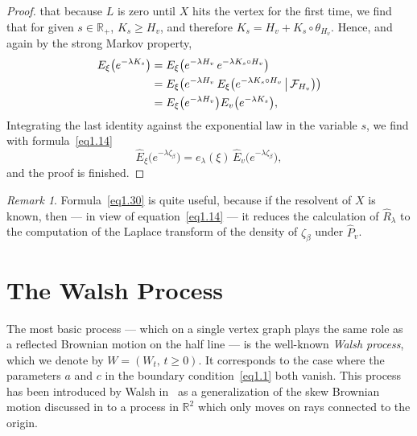 \documentclass[11pt,a4paper]{amsart}
\newcommand{\gb}{\beta}
\newcommand{\gl}{\lambda}
\newcommand{\cF}{\mathcal{F}}
\newcommand{\1}{1}
\newcommand{\R}{\mathbb{R}}
\theoremstyle{remark}
\newtheorem{remark}[theorem]{Remark}
\let\comp\circ
\newcommand{\cond}{\ensuremath\,\big|\,}
\newcommand{\hP}{\ensuremath{\hat P}}
\newcommand{\hE}{\ensuremath{\hat E}}
\newcommand{\hR}{\ensuremath{\hat R}}
\numberwithin{equation}{section}
\begin{document}
\begin{proof}
that because $L$ is zero until $X$ hits the vertex for the first time, we find
that for given $s\in\R_+$, $K_s\ge H_v$, and therefore $K_s = H_v + K_s\comp \theta_{H_v}$.
Hence, and again by the strong Markov property,
\begin{align*}
    E_\xi\bigl(e^{-\gl K_s}\bigr)
        &= E_\xi\bigl(e^{-\gl H_v}\,e^{-\gl K_s\comp H_v}\bigr)\\
        &= E_\xi\bigl(e^{-\gl H_v}\,E_\xi\bigl(e^{-\gl K_s\comp H_v}\cond \cF_{H_v}\bigr)\bigr)\\
        &= E_\xi\bigl(e^{-\gl H_v}\bigr) E_v\bigl(e^{-\gl K_s}\bigr),
\end{align*}
Integrating the last identity against the exponential law in the variable $s$, we
find with formula~\eqref{eq1.14}
\begin{equation*}
    \hE_\xi\bigl(e^{-\gl\zeta_\gb}\bigr) = e_\gl(\xi)\,\hE_v\bigl(e^{-\gl \zeta_\gb}\bigr),
\end{equation*}
and the proof is finished.
\end{proof}

\begin{remark}  \label{rem1.7}
Formula~\eqref{eq1.30} is quite useful, because if the resolvent of $X$ is known, then
--- in view of equation~\eqref{eq1.14} --- it reduces the calculation of $\hR_\gl$
to the computation of the Laplace transform of the density of $\zeta_\gb$ under
$\hP_v$.
\end{remark}

\section{The Walsh Process} \label{sect2}
The most basic process --- which on a single vertex graph plays the same role as a
reflected Brownian motion on the half line --- is the well-known \emph{Walsh
process}, which we denote by $W=(W_t,\,t\ge 0)$. It corresponds to the case where
the parameters $a$ and $c$ in the boundary condition~\eqref{eq1.1} both vanish. This
process has been introduced by Walsh in~\cite{Wa78} as a generalization of the skew
Brownian motion discussed in\cite[Chapter~4.2]{ItMc74} to a process in $\R^2$ which
only moves on rays connected to the origin.
\end{document}
